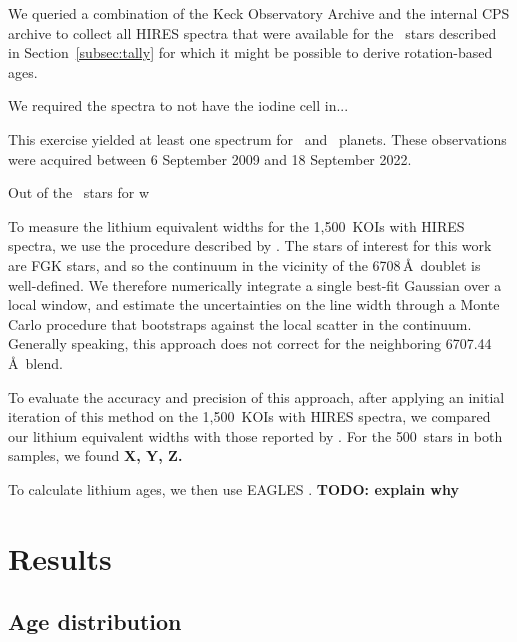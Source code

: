 \documentclass[11pt,twocolumn,tighten]{aastex63}
\newcommand{\nkoiswithhires}{{1{,}500}}
\newcommand{\nbergeroverlap}{{500}}
\begin{document}
We queried a combination of the Keck Observatory Archive and the
internal CPS archive to collect all HIRES spectra that were available
for the \nplhoststarwgyroagewithgrazingandhighruwe\ stars
described in Section~\ref{subsec:tally} for which it might be possible
to derive rotation-based ages.

%
We required the spectra to not have the iodine cell in...
%

This exercise yielded at least one spectrum for \nlithiumstars\ and 
\nlithiumplanets\ planets.
These observations were acquired between 6 September 2009 and 18
September 2022.


Out of the \nplhoststarwgyroagewithgrazingandhighruwe\ stars for w

To measure the lithium equivalent widths for the \nkoiswithhires\ KOIs
with HIRES spectra, we use the procedure described by
\citet{Bouma_2021}.
The stars of interest for this work are FGK stars, and so the
continuum in the vicinity of the
 6708\,\AA\ doublet is well-defined.
We therefore numerically integrate a single best-fit Gaussian over a
local window, and estimate the uncertainties on the line width through
a Monte Carlo procedure that bootstraps against the local scatter in the
continuum.
Generally speaking, this approach does not correct for the neighboring
 6707.44\,\AA\ blend.

To evaluate the accuracy and precision of this approach, after
applying an initial iteration of this method on the \nkoiswithhires\
KOIs with HIRES spectra, we compared our lithium equivalent widths
with those reported by \citet{Berger_2018}.
For the \nbergeroverlap\ stars in both samples, 
we found {\bf X, Y, Z.}

To calculate lithium ages, we then use EAGLES \citep{Jeffries_2023}.
{\bf TODO: explain why}







\section{Results}
\label{sec:results}


\subsection{Age distribution}
\end{document}
